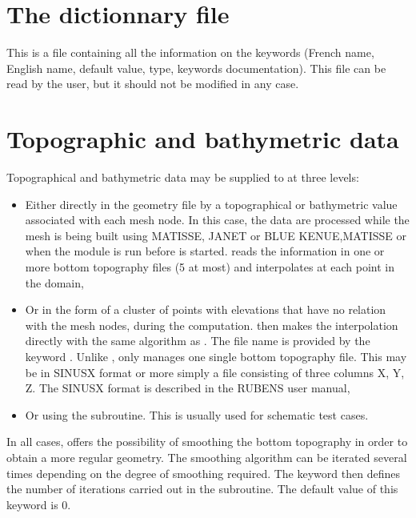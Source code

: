 \section{The dictionnary file}

This is a file containing all the information on the keywords (French name,
English name, default value, type, keywords documentation). This file can be
read by the user, but it should not be modified in any case.

\section{Topographic and bathymetric data}
\label{sec:topo}
Topographical and bathymetric data may be supplied to  at three
levels:

\begin{itemize}
\item Either directly in the geometry file by a topographical or bathymetric
value associated with each mesh node. In this case, the data are processed
while the mesh is being built using MATISSE, JANET or BLUE KENUE,MATISSE or
when the \bief module is run before  is started. \bief reads
the information in one or more bottom topography files (5 at most) and
interpolates at each point in the domain,

\item Or in the form of a cluster of points with elevations that have no
relation with the mesh nodes, during the  computation. 
then makes the interpolation directly with the same algorithm as \bief. The
file name is provided by the keyword . Unlike
\bief,  only manages one single bottom topography file. This may be
in SINUSX format or more simply a file consisting of three columns X, Y, Z. The
SINUSX format is described in the RUBENS user manual,

\item Or using the  subroutine. This is usually used for schematic
test cases.
\end{itemize}

In all cases,  offers the possibility of smoothing the bottom
topography in order to obtain a more regular geometry. The smoothing algorithm
can be iterated several times depending on the degree of smoothing required.
The keyword  then defines the number of
iterations carried out in the  subroutine. The default
value of this keyword is 0.
